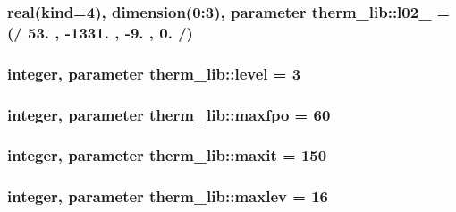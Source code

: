 \subsubsection[{l02\+\_\+10}]{\setlength{\rightskip}{0pt plus 5cm}real(kind=4), dimension(0\+:3), parameter therm\+\_\+lib\+::l02\+\_ = (/ 53. , -\/1331. , -\/9. , 0. /)}\label{namespacetherm__lib_adaf6c70605ef5072ebc0a71bb1189d99}
\hypertarget{namespacetherm__lib_ace5c9fdd5940d4602568d9d3df5c930f}{}
\subsubsection[{level}]{\setlength{\rightskip}{0pt plus 5cm}integer, parameter therm\+\_\+lib\+::level = 3}\label{namespacetherm__lib_ace5c9fdd5940d4602568d9d3df5c930f}
\hypertarget{namespacetherm__lib_a726eec5f615e82a7ab9542aad323ff6b}{}
\subsubsection[{maxfpo}]{\setlength{\rightskip}{0pt plus 5cm}integer, parameter therm\+\_\+lib\+::maxfpo = 60}\label{namespacetherm__lib_a726eec5f615e82a7ab9542aad323ff6b}
\hypertarget{namespacetherm__lib_af55ed6ff22d96d8e9778f1b9711a5f29}{}
\subsubsection[{maxit}]{\setlength{\rightskip}{0pt plus 5cm}integer, parameter therm\+\_\+lib\+::maxit = 150}\label{namespacetherm__lib_af55ed6ff22d96d8e9778f1b9711a5f29}
\hypertarget{namespacetherm__lib_a4369cbefc67fc26498b97b24ca760dcd}{}
\subsubsection[{maxlev}]{\setlength{\rightskip}{0pt plus 5cm}integer, parameter therm\+\_\+lib\+::maxlev = 16}\label{namespacetherm__lib_a4369cbefc67fc26498b97b24ca760dcd}
\hypertarget{namespacetherm__lib_ac36c121987554589b16d515ddc351939}{}
